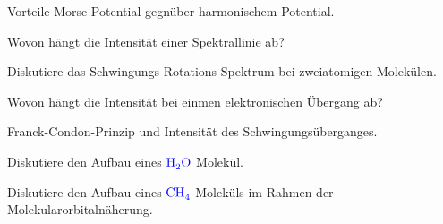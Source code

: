 \documentclass[a5paper,12pt,ngerman,print,grid=front]{kartei}
\let\oldce\ce
\renewcommand*{\ce}[1]{\begingroup\color{blue}\oldce{#1}\endgroup}
\begin{document}
	\begin{karte}{
		Vorteile Morse-Potential gegnüber harmonischem Potential.
        }
          
          
          
    \end{karte}


	\begin{karte}{
		Wovon hängt die Intensität einer Spektrallinie ab?
        }
          
          
          
    \end{karte}


	\begin{karte}{
		Diskutiere das Schwingungs-Rotations-Spektrum bei zweiatomigen Molekülen.
        }
          
          
          
    \end{karte}


	\begin{karte}{
		Wovon hängt die Intensität bei einmen elektronischen Übergang ab?
        }
          
          
          
    \end{karte}


	\begin{karte}{
		Franck-Condon-Prinzip und Intensität des Schwingungsüberganges.
        }
          
          
          
    \end{karte}


	\begin{karte}{
		Diskutiere den Aufbau eines $\ce{H2O}$ Molekül.
        }
          
          
          
    \end{karte}


	\begin{karte}{
		Diskutiere den Aufbau eines $\ce{CH4}$ Moleküls im Rahmen der Molekularorbitalnäherung.
        }
          
          
          
    \end{karte}
\end{document}
